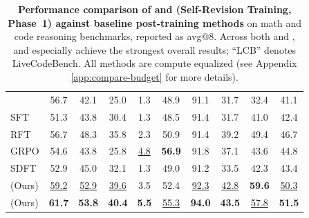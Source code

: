 \begin{table}[t]
\begin{tabular}{l@{\hspace{1.6pt}}ccc@{\hspace{2pt}}c@{\hspace{2pt}}ccccc}
\textbf{\olmo{}}           & 56.7            & 42.1            & 25.0            & 1.3            & 48.9            & 91.1            & 31.7            & 32.4            & 41.1            \\
SFT                        & 51.3            & 43.8            & 30.4            & 1.3            & 48.5            & 91.4            & 31.7            & 41.0            & 42.4            \\
RFT                        & 56.7            & 48.3            & 35.8            & 2.3            & 50.9            & 91.4            & 39.2            & 49.4            & 46.7            \\
GRPO                       & 54.6            & 43.8            & 25.8            & \underline{4.8} & \textbf{56.9}   & 91.8            & 37.1            & 43.6            & 44.8            \\
SDFT                       & 52.9            & 45.0            & 32.1            & 1.3            & 49.0            & 91.2            & 33.5            & 42.3            & 43.4            \\
\textbf{\sft{}} (Ours)     & \underline{59.2} & \underline{52.9} & \underline{39.6} & 3.5            & 52.4            & \underline{92.3} & \underline{42.8} & \textbf{59.6}   & \underline{50.3} \\
\rowcolor{lightblue!80}
\textbf{\ours{}} (Ours)    & \textbf{61.7}   & \textbf{53.8}   & \textbf{40.4}   & \textbf{5.5}   & \underline{55.3} & \textbf{94.0}   & \textbf{43.5}   & \underline{57.8} & \textbf{51.5}   \\
\bottomrule
\end{tabular}
\caption{\textbf{Performance comparison of \ours{} and \sft{} (Self-Revision Training, Phase~1) against baseline post-training methods} on math and code reasoning benchmarks, reported as avg@8. Across both \qwen{} and \olmo{}, \sft{} and especially \ours{} achieve the strongest overall results; “LCB” denotes LiveCodeBench. All methods are compute equalized (see Appendix \ref{app:compare-budget} for more details).}
\vspace{-10pt}
\label{tab:main_results}
\end{table}